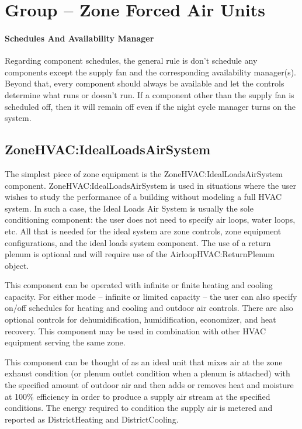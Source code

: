 \section{Group -- Zone Forced Air Units}\label{group-zone-forced-air-units}

\paragraph{Schedules And Availability Manager}\label{schedules-and-availability-manager}
Regarding component schedules, the general rule is don't schedule any components except the supply fan and the corresponding availability manager(s). Beyond that, every component should always be available and let the controls determine what runs or doesn't run. If a component other than the supply fan is scheduled off, then it will remain off even if the night cycle manager turns on the system.

\subsection{ZoneHVAC:IdealLoadsAirSystem}\label{zonehvacidealloadsairsystem}

The simplest piece of zone equipment is the ZoneHVAC:IdealLoadsAirSystem component. ZoneHVAC:IdealLoadsAirSystem is used in situations where the user wishes to study the performance of a building without modeling a full HVAC system. In such a case, the Ideal Loads Air System is usually the sole conditioning component: the user does not need to specify air loops, water loops, etc. All that is needed for the ideal system are zone controls, zone equipment configurations, and the ideal loads system component. The use of a return plenum is optional and will require use of the AirloopHVAC:ReturnPlenum object.

This component can be operated with infinite or finite heating and cooling capacity. For either mode -- infinite or limited capacity -- the user can also specify on/off schedules for heating and cooling and outdoor air controls. There are also optional controls for dehumidification, humidification, economizer, and heat recovery. This component may be used in combination with other HVAC equipment serving the same zone.

This component can be thought of as an ideal unit that mixes air at the zone exhaust condition (or plenum outlet condition when a plenum is attached) with the specified amount of outdoor air and then adds or removes heat and moisture at 100\% efficiency in order to produce a supply air stream at the specified conditions. The energy required to condition the supply air is metered and reported as DistrictHeating and DistrictCooling.

